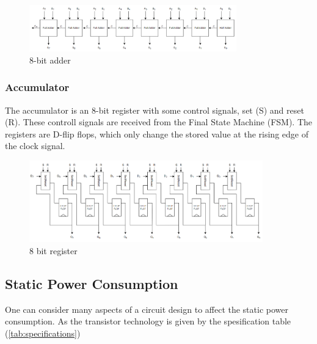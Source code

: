 \begin{figure}[H]
    \centering
    \includegraphics[width=0.8\textwidth]{Figures/8bitadder.png}
    \caption{8-bit adder}
    \label{fig:adder-blokk}
\end{figure}


\subsubsection{Accumulator}
The accumulator is an 8-bit register with some control signals, set (S) and reset (R). These controll signals are received from the Final State Machine (FSM). The registers are D-flip flops, which only change the stored value at the rising edge of the clock signal. 

\begin{figure}[H]
    \centering
    \includegraphics[width=0.9\textwidth]{Figures/8bitRegister.png}
    \caption{8 bit register}
    \label{fig:8bitregister}
\end{figure}



\subsection{Static Power Consumption}
\label{subsec:low_power}

One can consider many aspects of a circuit design to affect the static power consumption. As the transistor technology is given by the spesification table (\ref{tab:specifications})



